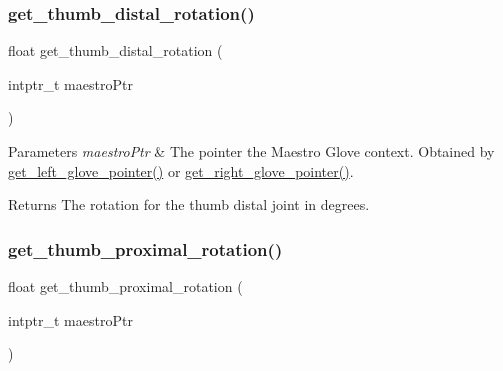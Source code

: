 \subsubsection{\texorpdfstring{get\+\_\+thumb\+\_\+distal\+\_\+rotation()}{get\_thumb\_distal\_rotation()}}
{\footnotesize\ttfamily float get\+\_\+thumb\+\_\+distal\+\_\+rotation (\begin{DoxyParamCaption}\item[{intptr\+\_\+t}]{maestro\+Ptr }\end{DoxyParamCaption})}


\begin{DoxyParams}{Parameters}
{\em maestro\+Ptr} & The pointer the Maestro Glove context. Obtained by \hyperlink{group__glove_management_ga63ce3c99d4a8b8db851b22af9185764e}{get\+\_\+left\+\_\+glove\+\_\+pointer()} or \hyperlink{group__glove_management_ga9b8fd9d91aeac3f8da50f7a7eba0c32b}{get\+\_\+right\+\_\+glove\+\_\+pointer()}. \\
\hline
\end{DoxyParams}
\begin{DoxyReturn}{Returns}
The rotation for the thumb distal joint in degrees. 
\end{DoxyReturn}
\mbox{\label{group__rotation_access_gafc4acff90b0a11899e18ab2212ec6ce2}} 
\subsubsection{\texorpdfstring{get\+\_\+thumb\+\_\+proximal\+\_\+rotation()}{get\_thumb\_proximal\_rotation()}}
{\footnotesize\ttfamily float get\+\_\+thumb\+\_\+proximal\+\_\+rotation (\begin{DoxyParamCaption}\item[{intptr\+\_\+t}]{maestro\+Ptr }\end{DoxyParamCaption})}


